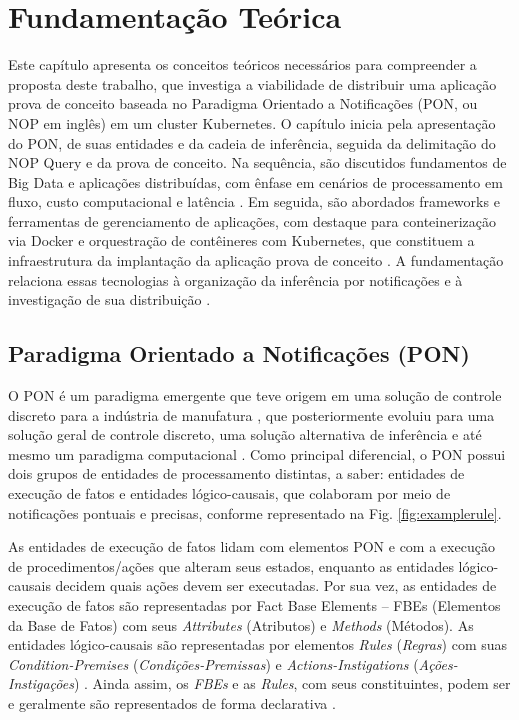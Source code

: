 \chapter{Fundamentação Teórica}
\label{cap-fundamentacao}

Este capítulo apresenta os conceitos teóricos necessários para compreender a proposta deste trabalho, que investiga a viabilidade de distribuir uma aplicação prova de conceito baseada no Paradigma Orientado a Notificações (PON, ou NOP em inglês) em um cluster Kubernetes. O capítulo inicia pela apresentação do PON, de suas entidades e da cadeia de inferência, seguida da delimitação do NOP Query e da prova de conceito. Na sequência, são discutidos fundamentos de Big Data e aplicações distribuídas, com ênfase em cenários de processamento em fluxo, custo computacional e latência \cite{furht2016,ousous2018,alam2020}. Em seguida, são abordados frameworks e ferramentas de gerenciamento de aplicações, com destaque para conteinerização via Docker e orquestração de contêineres com Kubernetes, que constituem a infraestrutura da implantação da aplicação prova de conceito \cite{burns2019,docker2026documentation,kubernetes2026documentation}. A fundamentação relaciona essas tecnologias à organização da inferência por notificações e à investigação de sua distribuição \cite{Simao2005thesis,Simao2009inferencebasednotifications,linhares2020,neves2021application,kossoski2024tese}.

\section{Paradigma Orientado a Notificações (PON)}

O PON é um paradigma emergente que teve origem em uma solução de controle discreto para a indústria de manufatura \citep{simaostadzisz2008patentepon}, que posteriormente evoluiu para uma solução geral de controle discreto, uma solução alternativa de inferência e até mesmo um paradigma computacional \citep{simao2012noppicomparison}. 
Como principal diferencial, o PON possui dois grupos de entidades de processamento distintas, a saber: entidades de execução de fatos e entidades lógico-causais, que colaboram por meio de notificações pontuais e precisas, conforme representado na Fig. \ref{fig:examplerule}.

As entidades de execução de fatos lidam com elementos PON e com a execução de procedimentos/ações que alteram seus estados, enquanto as entidades lógico-causais decidem quais ações devem ser executadas. Por sua vez, as entidades de execução de fatos são representadas por Fact Base Elements -- FBEs (Elementos da Base de Fatos) com seus \textit{Attributes} (Atributos) e \textit{Methods} (Métodos). As entidades lógico-causais são representadas por elementos \textit{Rules} (\textit{Regras}) com suas \textit{Condition-Premises} (\textit{Condições-Premissas}) e \textit{Actions-Instigations} (\textit{Ações-Instigações}) \citep{linhares2020,ronszcka2017noplanguagecompiler}. 
Ainda assim, os \textit{FBEs} e as \textit{Rules}, com seus constituintes, podem ser e geralmente são representados de forma declarativa \citep{neves2021application}.


